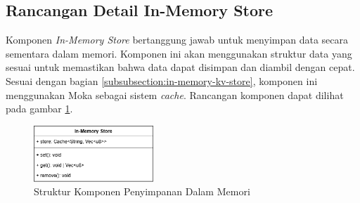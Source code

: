 \subsection{Rancangan Detail In-Memory Store}
\label{subsection:detail-in-memory-store}

Komponen \textit{In-Memory Store} bertanggung jawab untuk menyimpan data secara sementara dalam memori. Komponen ini akan menggunakan struktur data yang sesuai untuk memastikan bahwa data dapat disimpan dan diambil dengan cepat. Sesuai dengan bagian \ref{subsubsection:in-memory-kv-store}, komponen ini menggunakan Moka sebagai sistem \textit{cache}. Rancangan komponen dapat dilihat pada gambar \ref{fig:in-memory-store-component}.

\begin{figure}[ht]
    \centering
    \includegraphics[width=0.4\textwidth]{resources/chapter-3/in-memory-store-component.png}
    \caption{Struktur Komponen Penyimpanan Dalam Memori}
    \label{fig:in-memory-store-component}
\end{figure}
